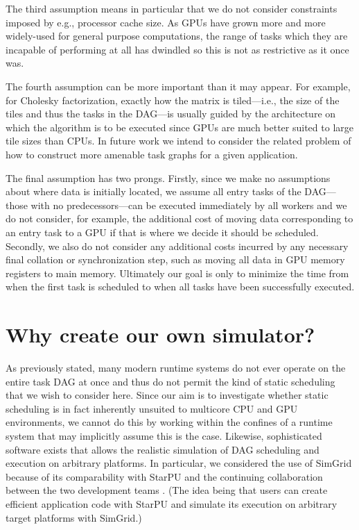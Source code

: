 \documentclass[runningheads]{llncs}
\begin{document}
The third assumption means in particular that we do not consider constraints imposed by e.g., processor cache size. As GPUs have grown more and more widely-used for general purpose computations, the range of tasks which they are incapable of performing at all has dwindled so this is not as restrictive as it once was.

The fourth assumption can be more important than it may appear. For example, for Cholesky factorization, exactly how the matrix is tiled---i.e., the size of the tiles and thus the tasks in the DAG---is usually guided by the architecture on which the algorithm is to be executed since GPUs are much better suited to large tile sizes than CPUs. In future work we intend to consider the related problem of how to construct more amenable task graphs for a given application. 

The final assumption has two prongs. Firstly, since we make no assumptions about where data is initially located, we assume all entry tasks of the DAG---those with no predecessors---can be executed immediately by all workers and we do not consider, for example, the additional cost of moving data corresponding to an entry task to a GPU if that is where we decide it should be scheduled. Secondly, we also do not consider any additional costs incurred by any necessary final collation or synchronization step, such as moving all data in GPU memory registers to main memory. Ultimately our goal is only to minimize the time from when the first task is scheduled to when all tasks have been successfully executed.


\section{Why create our own simulator?}
\label{sect.why}

As previously stated, many modern runtime systems do not ever operate on the entire task DAG at once and thus do not permit the kind of static scheduling that we wish to consider here. Since our aim is to investigate whether static scheduling is in fact inherently unsuited to multicore CPU and GPU environments, we cannot do this by working within the confines of a runtime system that may implicitly assume this is the case. Likewise, sophisticated software exists that allows the realistic simulation of DAG scheduling and execution on arbitrary platforms. In particular, we considered the use of SimGrid \cite{simgrid} because of its comparability with StarPU and the continuing collaboration between the two development teams \cite{stanisic15,stanisic2014modeling}. (The idea being that users can create efficient application code with StarPU and simulate its execution on arbitrary target platforms with SimGrid.) 
\end{document}

